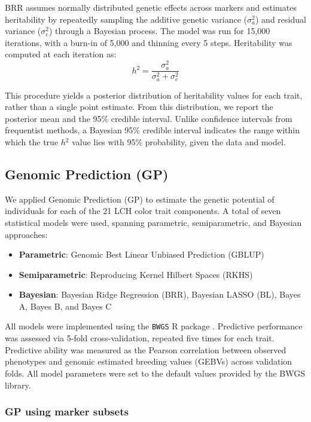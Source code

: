 \documentclass[pdflatex,sn-mathphys-ay]{sn-jnl}%
\begin{document}
BRR assumes normally distributed genetic effects across markers and estimates heritability by repeatedly sampling the additive genetic variance ($\sigma_{a}^{2}$) and residual variance ($\sigma_{e}^{2}$) through a Bayesian process. The model was run for 15,000 iterations, with a burn-in of 5,000 and thinning every 5 steps. Heritability was computed at each iteration as:\\
\[
h{{}^2}=\dfrac{\sigma_{a}^{2}}{\sigma_{a}^{2}+\sigma_{e}^{2}}
\]

This procedure yields a posterior distribution of heritability values for each trait, rather than a single point estimate. From this distribution, we report the posterior mean and the 95\% credible interval. Unlike confidence intervals from frequentist methods, a Bayesian 95\% credible interval indicates the range within which the true $h{{}^2}$ value lies with 95\% probability, given the data and model.

\subsection{Genomic Prediction (GP)}
We applied Genomic Prediction (GP) to estimate the genetic potential of individuals for each of the 21 LCH color trait components. A total of seven statistical models were used, spanning parametric, semiparametric, and Bayesian approaches:
\begin{itemize}
\item \textbf{Parametric}: Genomic Best Linear Unbiased Prediction (GBLUP)
\item \textbf{Semiparametric}: Reproducing Kernel Hilbert Spaces (RKHS)
\item \textbf{Bayesian}: Bayesian Ridge Regression (BRR), Bayesian LASSO (BL), Bayes A, Bayes B, and Bayes C
\end{itemize}
All models were implemented using the \texttt{BWGS} R package \citep{Charmet2020}. Predictive performance was assessed via 5-fold cross-validation, repeated five times for each trait. Predictive ability was measured as the Pearson correlation between observed phenotypes and genomic estimated breeding values (GEBVs) across validation folds. All model parameters were set to the default values provided by the BWGS library.

\subsubsection{GP using marker subsets}
\end{document}
